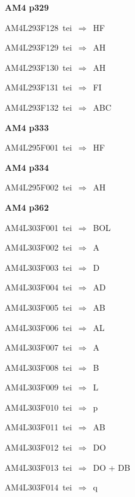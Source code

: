 \par\vfill\eject
{\bf\hfill AM4 p329\hfill\hbox{}}\par\bigskip
{\sixrm AM4L293F128\ {\sixit tei}\ }$\Rightarrow$\ HF\par\smallskip
{\sixrm AM4L293F129\ {\sixit tei}\ }$\Rightarrow$\ AH\par\smallskip
{\sixrm AM4L293F130\ {\sixit tei}\ }$\Rightarrow$\ AH\par\smallskip
{\sixrm AM4L293F131\ {\sixit tei}\ }$\Rightarrow$\ FI\par\smallskip
{\sixrm AM4L293F132\ {\sixit tei}\ }$\Rightarrow$\ ABC\par\smallskip

\par\vfill\eject
{\bf\hfill AM4 p333\hfill\hbox{}}\par\bigskip
{\sixrm AM4L295F001\ {\sixit tei}\ }$\Rightarrow$\ HF\par\smallskip

\par\vfill\eject
{\bf\hfill AM4 p334\hfill\hbox{}}\par\bigskip
{\sixrm AM4L295F002\ {\sixit tei}\ }$\Rightarrow$\ AH\par\smallskip

\par\vfill\eject
{\bf\hfill AM4 p362\hfill\hbox{}}\par\bigskip
{\sixrm AM4L303F001\ {\sixit tei}\ }$\Rightarrow$\ BOL\par\smallskip
{\sixrm AM4L303F002\ {\sixit tei}\ }$\Rightarrow$\ A\par\smallskip
{\sixrm AM4L303F003\ {\sixit tei}\ }$\Rightarrow$\ D\par\smallskip
{\sixrm AM4L303F004\ {\sixit tei}\ }$\Rightarrow$\ AD\par\smallskip
{\sixrm AM4L303F005\ {\sixit tei}\ }$\Rightarrow$\ AB\par\smallskip
{\sixrm AM4L303F006\ {\sixit tei}\ }$\Rightarrow$\ AL\par\smallskip
{\sixrm AM4L303F007\ {\sixit tei}\ }$\Rightarrow$\ A\par\smallskip
{\sixrm AM4L303F008\ {\sixit tei}\ }$\Rightarrow$\ B\par\smallskip
{\sixrm AM4L303F009\ {\sixit tei}\ }$\Rightarrow$\ L\par\smallskip
{\sixrm AM4L303F010\ {\sixit tei}\ }$\Rightarrow$\ {\tenit p}\par\smallskip
{\sixrm AM4L303F011\ {\sixit tei}\ }$\Rightarrow$\ AB\par\smallskip
{\sixrm AM4L303F012\ {\sixit tei}\ }$\Rightarrow$\ DO\par\smallskip
{\sixrm AM4L303F013\ {\sixit tei}\ }$\Rightarrow$\ DO + DB\par\smallskip
{\sixrm AM4L303F014\ {\sixit tei}\ }$\Rightarrow$\ {\tenit q}\par\smallskip

